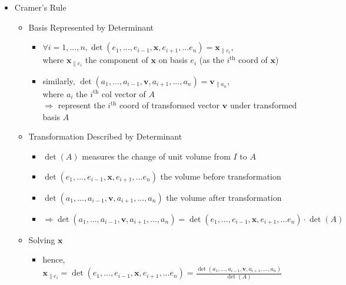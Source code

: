 \begin{itemize}
\item Cramer's Rule
	\begin{itemize}
	\item Basis Represented by Determinant
		\begin{itemize}
		\item $\forall i = {1,...,n},\det(e_1,...,e_{i-1}, \mathbf x, e_{i+1},...e_n) = \mathbf x_{\parallel e_i}$, \\
		where $\mathbf x_{\parallel e_i}$ the component of $\mathbf x$ on basis $e_i$ (as the $i^\text{th}$ coord of $\mathbf x$)
		\item similarly, $\det(a_1,...,a_{i-1}, \mathbf v, a_{i+1}, ..., a_n) = \mathbf v_{\parallel a_n}$, \\
		where $a_i$ the $i^\text{th}$ col vector of $A$ \\
		$\Rightarrow$ represent the $i^\text{th}$ coord of transformed vector $\mathbf v$ under transformed basis $A$
		\end{itemize}
	\item Transformation Described by Determinant
		\begin{itemize}
		\item $\det(A)$ measures the change of unit volume from $I$ to $A$
		\item $\det(e_1,...,e_{i-1}, \mathbf x, e_{i+1},...e_n) $ the volume before transformation
		\item $\det (a_1,...,a_{i-1}, \mathbf v, a_{i+1}, ..., a_n)$ the volume after transformation
		\item  $\Rightarrow \det (a_1,...,a_{i-1}, \mathbf v, a_{i+1}, ..., a_n) = \det(e_1,...,e_{i-1}, \mathbf x, e_{i+1},...e_n) \cdot \det(A)$
		\end{itemize}
	\item Solving $\mathbf x$
		\begin{itemize}
		\item hence, $\displaystyle \mathbf x_{\parallel e_i} = \det(e_1,...,e_{i-1}, \mathbf x, e_{i+1},...e_n) = \frac {\det (a_1,...,a_{i-1}, \mathbf v, a_{i+1}, ..., a_n)}{\det(A)}$
		\end{itemize}
	\end{itemize}
\end{itemize}

